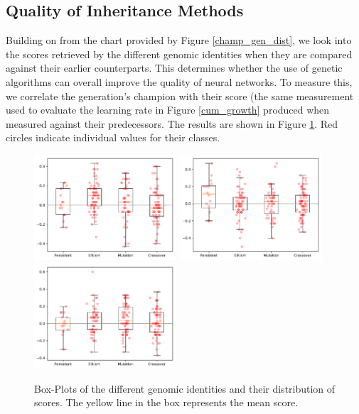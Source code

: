 \documentclass[12pt,a4paper]{article}
\begin{document}
    \subsection{Quality of Inheritance Methods}
        Building on from the chart provided by Figure \ref{champ_gen_dist}, we look into the scores retrieved by the different genomic identities when they are compared against their earlier counterparts. This determines whether the use of genetic algorithms can overall improve the quality of neural networks. To measure this, we correlate the generation's champion with their score (the same measurement used to evaluate the learning rate in Figure \ref{cum_growth} produced when measured against their predecessors. The results are shown in Figure \ref{champ_score_distribution}. Red circles indicate individual values for their classes.

        \begin{figure}[!ht]
            \centering
            \includegraphics[width=53mm]{images/results/1ply/champ_score_distribution.pdf}
            \includegraphics[width=53mm]{images/results/3ply/champ_score_distribution.pdf}
            \includegraphics[width=53mm]{images/results/6ply/champ_score_distribution.pdf}
            \caption{Box-Plots of the different genomic identities and their distribution of scores. The yellow line in the box represents the mean score. \label{champ_score_distribution}}
        \end{figure}
\end{document}
